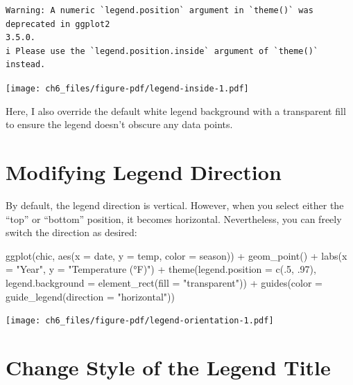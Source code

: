 \documentclass[
  letterpaper,
]{scrbook}
\newenvironment{Shaded}{\begin{snugshade}}{\end{snugshade}}
\newcommand{\AttributeTok}[1]{\textcolor[rgb]{0.40,0.45,0.13}{#1}}
\newcommand{\DecValTok}[1]{\textcolor[rgb]{0.68,0.00,0.00}{#1}}
\newcommand{\FunctionTok}[1]{\textcolor[rgb]{0.28,0.35,0.67}{#1}}
\newcommand{\NormalTok}[1]{\textcolor[rgb]{0.00,0.23,0.31}{#1}}
\newcommand{\SpecialCharTok}[1]{\textcolor[rgb]{0.37,0.37,0.37}{#1}}
\newcommand{\StringTok}[1]{\textcolor[rgb]{0.13,0.47,0.30}{#1}}
\begin{document}
\begin{verbatim}
Warning: A numeric `legend.position` argument in `theme()` was deprecated in ggplot2
3.5.0.
i Please use the `legend.position.inside` argument of `theme()` instead.
\end{verbatim}

\texttt{[image: ch6\_files/figure-pdf/legend-inside-1.pdf]}

Here, I also override the default white legend background with a
transparent fill to ensure the legend doesn't obscure any data points.

\section{Modifying Legend Direction}\label{modifying-legend-direction}

By default, the legend direction is vertical. However, when you select
either the ``top'' or ``bottom'' position, it becomes horizontal.
Nevertheless, you can freely switch the direction as desired:

\begin{Shaded}
\begin{Highlighting}[]
\FunctionTok{ggplot}\NormalTok{(chic, }\FunctionTok{aes}\NormalTok{(}\AttributeTok{x =}\NormalTok{ date, }\AttributeTok{y =}\NormalTok{ temp, }\AttributeTok{color =}\NormalTok{ season)) }\SpecialCharTok{+}
  \FunctionTok{geom\_point}\NormalTok{() }\SpecialCharTok{+}
  \FunctionTok{labs}\NormalTok{(}\AttributeTok{x =} \StringTok{"Year"}\NormalTok{, }\AttributeTok{y =} \StringTok{"Temperature (°F)"}\NormalTok{) }\SpecialCharTok{+}
  \FunctionTok{theme}\NormalTok{(}\AttributeTok{legend.position =} \FunctionTok{c}\NormalTok{(.}\DecValTok{5}\NormalTok{, .}\DecValTok{97}\NormalTok{),}
        \AttributeTok{legend.background =} \FunctionTok{element\_rect}\NormalTok{(}\AttributeTok{fill =} \StringTok{"transparent"}\NormalTok{)) }\SpecialCharTok{+}
  \FunctionTok{guides}\NormalTok{(}\AttributeTok{color =} \FunctionTok{guide\_legend}\NormalTok{(}\AttributeTok{direction =} \StringTok{"horizontal"}\NormalTok{))}
\end{Highlighting}
\end{Shaded}

\texttt{[image: ch6\_files/figure-pdf/legend-orientation-1.pdf]}

\section{Change Style of the Legend
Title}\label{change-style-of-the-legend-title}
\end{document}
